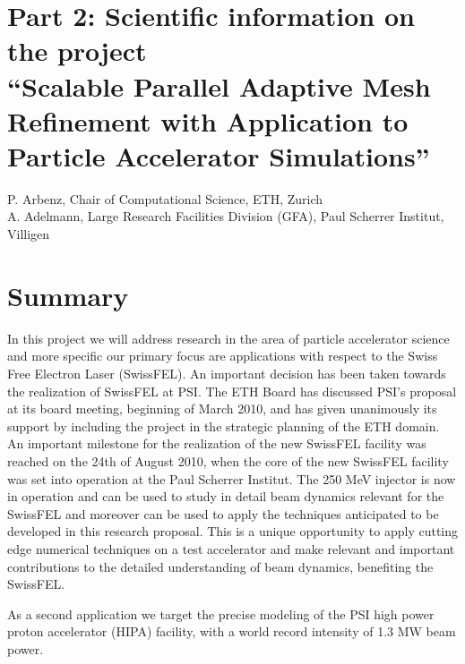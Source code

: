 \documentclass[11pt,pdftex]{article}
\begin{document}
\setcounter{section}{1}
\renewcommand{\thesection}{}%

\section{
  \hspace*{-5mm}%
  \LARGE Part 2: Scientific information on the project \\
  ``Scalable Parallel Adaptive Mesh Refinement 
  with Application to Particle Accelerator Simulations''}

\begin{center}
  P. Arbenz, Chair of Computational Science, ETH, Zurich \\
  A. Adelmann, Large Research Facilities Division (GFA), Paul Scherrer
  Institut, Villigen
\end{center}

\renewcommand{\thesection}{\arabic{section}}
\setcounter{section}{0}

\section{Summary}

In this project we will address research in the area of particle
accelerator science and more specific our primary focus are applications
with respect to the Swiss Free Electron Laser (SwissFEL).  An important
decision has been taken towards the realization of SwissFEL at PSI.  The
ETH Board has discussed PSI's proposal at its board meeting, beginning
of March 2010, and has given unanimously its support by including the
project in the strategic planning of the ETH domain. An important
milestone for the realization of the new SwissFEL facility was reached
on the 24th of August 2010, when the core of the new SwissFEL facility
was set into operation at the Paul Scherrer Institut.  The 250 MeV
injector is now in operation and can be used to study in detail beam
dynamics relevant for the SwissFEL and moreover can be used to apply the
techniques anticipated to be developed in this research proposal.  This
is a unique opportunity to apply cutting edge numerical techniques on a
test accelerator and make relevant and important contributions to the
detailed understanding of beam dynamics, benefiting the SwissFEL.
 
As a second application we target the precise modeling of the PSI high
power proton accelerator (HIPA) facility, with a world record intensity
of 1.3 MW beam power.
\end{document}
